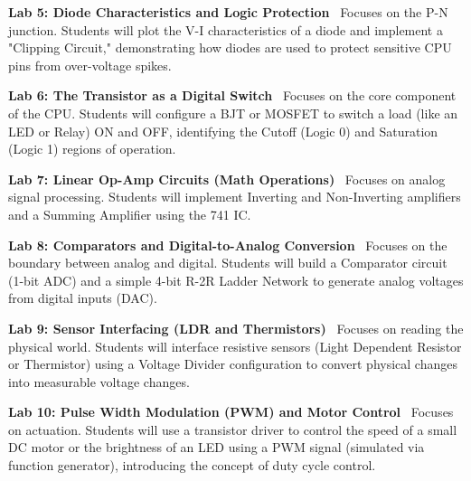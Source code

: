 \vspace{0.2cm}

\noindent\textbf{Lab 5: Diode Characteristics and Logic Protection} \
Focuses on the P-N junction. Students will plot the V-I characteristics of a diode and implement a "Clipping Circuit," demonstrating how diodes are used to protect sensitive CPU pins from over-voltage spikes. \\

\vspace{0.2cm}

\noindent\textbf{Lab 6: The Transistor as a Digital Switch} \
Focuses on the core component of the CPU. Students will configure a BJT or MOSFET to switch a load (like an LED or Relay) ON and OFF, identifying the Cutoff (Logic 0) and Saturation (Logic 1) regions of operation. \\

\vspace{0.2cm}

\noindent\textbf{Lab 7: Linear Op-Amp Circuits (Math Operations)} \
Focuses on analog signal processing. Students will implement Inverting and Non-Inverting amplifiers and a Summing Amplifier using the 741 IC. \\

\vspace{0.2cm}

\noindent\textbf{Lab 8: Comparators and Digital-to-Analog Conversion} \
Focuses on the boundary between analog and digital. Students will build a Comparator circuit (1-bit ADC) and a simple 4-bit R-2R Ladder Network to generate analog voltages from digital inputs (DAC). \\

\vspace{0.2cm}

\noindent\textbf{Lab 9: Sensor Interfacing (LDR and Thermistors)} \
Focuses on reading the physical world. Students will interface resistive sensors (Light Dependent Resistor or Thermistor) using a Voltage Divider configuration to convert physical changes into measurable voltage changes. \\

\vspace{0.2cm}

\noindent\textbf{Lab 10: Pulse Width Modulation (PWM) and Motor Control} \
Focuses on actuation. Students will use a transistor driver to control the speed of a small DC motor or the brightness of an LED using a PWM signal (simulated via function generator), introducing the concept of duty cycle control.

\newpage
{}
